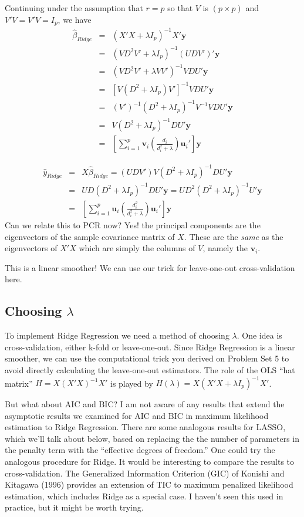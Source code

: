 \documentclass[12pt]{article}
\theoremstyle{definition}
\begin{document}
Continuing under the assumption that $r = p$ so that $V$ is $(p\times p)$ and $V'V = V'V = I_p$, we have
	\begin{eqnarray*}
		\widehat{\beta}_{Ridge} &=& \left(X'X  +\lambda I_p\right)^{-1} X'\mathbf{y} \\
		&=& \left(VD^2V' + \lambda I_p\right)^{-1}(UDV')' \mathbf{y}\\
		&=& \left(VD^2V' + \lambda VV'\right)^{-1}VDU' \mathbf{y}\\
		&=& \left[V(D^2 + \lambda I_p)V'\right]^{-1}VDU'\mathbf{y}\\
		&=&(V')^{-1}(D^2 + \lambda I_p)^{-1}V^{-1}VDU' \mathbf{y}\\
		&=& V(D^2 + \lambda I_p)^{-1}DU'\mathbf{y}\\
		&=& \left[\sum_{i=1}^p \mathbf{v}_i \left(\frac{d_i}{d_i^2 + \lambda}\right) \mathbf{u}_i'\right] \mathbf{y}
	\end{eqnarray*}

\begin{eqnarray*}
	\widehat{y}_{Ridge} &=& X\widehat{\beta}_{Ridge} = (UDV')V(D^2 + \lambda I_p)^{-1}DU'\mathbf{y}\\
	&=& UD(D^2 + \lambda I_p)^{-1}DU'\mathbf{y} = UD^2(D^2 + \lambda I_p)^{-1}U'\mathbf{y}\\
	&=&\left[\sum_{i=1}^p \mathbf{u}_i \left(\frac{d_i^2}{d_i^2 +\lambda}\right)\mathbf{u}_i' \right] \mathbf{y}
\end{eqnarray*}
Can we relate this to PCR now? Yes! the principal components are the eigenvectors of the sample covariance matrix of $X$. These are the \emph{same} as the eigenvectors of $X'X$ which are simply the columns of $V$, namely the $\mathbf{v}_i$.

This is a linear smoother! We can use our trick for leave-one-out cross-validation here.

\subsection{Choosing $\lambda$}
To implement Ridge Regression we need a method of choosing $\lambda$. One idea is cross-validation, either k-fold or leave-one-out. Since Ridge Regression is a linear smoother, we can use the computational trick you derived on Problem Set 5 to avoid directly calculating the leave-one-out estimators. The role of the OLS ``hat matrix'' $H = X(X'X)^{-1}X'$ is played by $H(\lambda) = X(X'X + \lambda I_p)^{-1} X'$.

But what about AIC and BIC? I am not aware of any results that extend the asymptotic results we examined for AIC and BIC in maximum likelihood estimation to Ridge Regression. There are some analogous results for LASSO, which we'll talk about below, based on replacing the the number of parameters in the penalty term with the ``effective degrees of freedom.'' One could try the analogous procedure for Ridge. It would be interesting to compare the results to cross-validation. The Generalized Information Criterion (GIC) of Konishi and Kitagawa (1996) provides an extension of TIC to maximum penalized likelihood estimation, which includes Ridge as a special case. I haven't seen this used in practice, but it might be worth trying.
\end{document}
